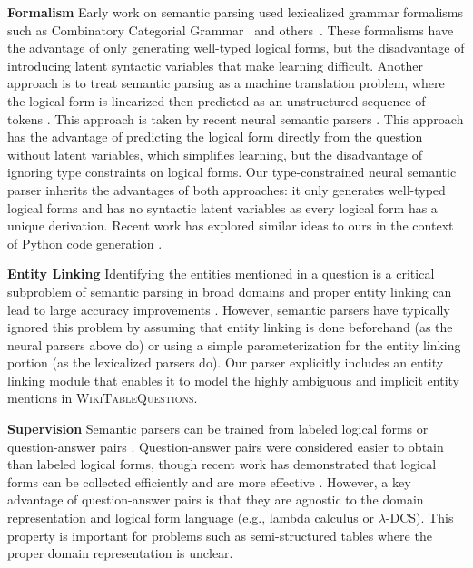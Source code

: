 \textbf{Formalism} Early work on semantic parsing used lexicalized grammar
formalisms such as Combinatory Categorial
Grammar~\cite{zettlemoyer05,zettlemoyer2007online,kwiatkowski2011lexical,kwiatkowski2013,krishnamurthy2012weakly,artzi2013}
and
others~\cite{liang2011learning,berant2013,zhao2015,wong2006learning,wong2007learning}.
These formalisms have the advantage of only generating well-typed logical
forms, but the disadvantage of introducing latent syntactic variables that make
learning difficult. Another approach is to treat semantic parsing as a machine
translation problem, where the logical form is linearized then predicted as an
unstructured sequence of tokens \cite{andreas2013}.  This approach is taken by
recent neural semantic parsers \cite{jia2016,dong2016,locascio2016,ling2016}.
This approach has the advantage of predicting the logical form directly from
the question without latent variables, which simplifies learning, but the
disadvantage of ignoring type constraints on logical forms.  Our
type-constrained neural semantic parser inherits the advantages of both
approaches: it only generates well-typed logical forms and has no syntactic
latent variables as every logical form has a unique derivation. Recent work has
explored similar ideas to ours in the context of Python code generation
\cite{yin17acl,rabinovich17acl}.

\textbf{Entity Linking} Identifying the entities mentioned in a question is a
critical subproblem of semantic parsing in broad domains and proper entity
linking can lead to large accuracy improvements \cite{yih2015stagg}.  However,
semantic parsers have typically ignored this problem by assuming that entity
linking is done beforehand (as the neural parsers above do) or using a simple
parameterization for the entity linking portion (as the lexicalized parsers
do). Our parser explicitly includes an entity linking module that enables it to
model the highly ambiguous and implicit entity mentions in
\textsc{WikiTableQuestions}.

\textbf{Supervision} Semantic parsers can be trained from labeled logical forms
\cite{zelle1996,zettlemoyer05} or question-answer pairs
\cite{liang2011learning,berant2013}. Question-answer pairs were considered
easier to obtain than labeled logical forms, though recent work has
demonstrated that logical forms can be collected efficiently and are more
effective \cite{yih2016value}. However, a key advantage of question-answer
pairs is that they are agnostic to the domain representation and logical form
language (e.g., lambda calculus or $\lambda$-DCS). This property is important
for problems such as semi-structured tables where the proper domain
representation is unclear.


